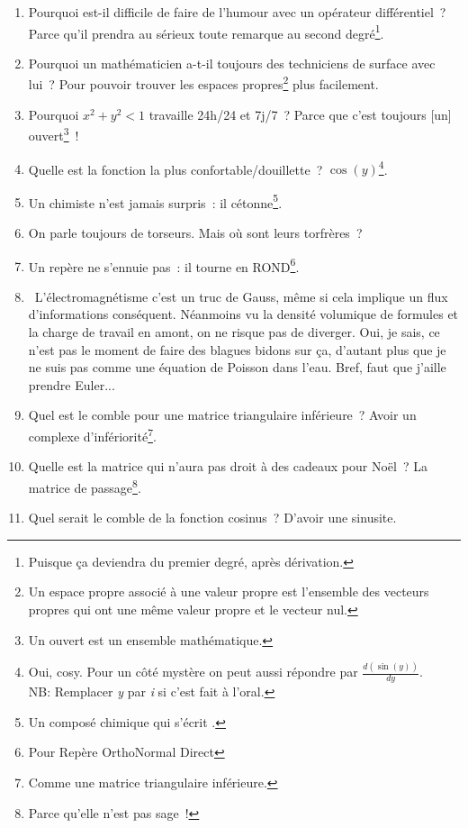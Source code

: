 \documentclass[10pt,a5paper,fullpage]{book}
\begin{document}
\begin{enumerate}
		\item Pourquoi est-il difficile de faire de l’humour avec un opérateur différentiel~? Parce qu’il prendra au sérieux toute remarque au second degré\footnote{Puisque ça deviendra du premier degré, après dérivation.}.
		\item Pourquoi un mathématicien a-t-il toujours des techniciens de surface avec lui~? Pour pouvoir trouver les espaces propres\footnote{Un espace propre associé à une valeur propre est l'ensemble des vecteurs propres qui ont une même valeur propre et le vecteur nul.} plus facilement.
		\item Pourquoi $x^{2}+y^{2} < 1$ travaille 24h/24 et 7j/7~? Parce que c’est toujours [un] ouvert\footnote{Un ouvert est un ensemble mathématique.}~!
		\item Quelle est la fonction la plus confortable/douillette~? $\cos(y)$\footnote{Oui, cosy. Pour un côté mystère on peut aussi répondre par $\frac{d(\sin({y}))}{dy}$. \\NB: Remplacer \textit{y} par \textit{i} si c’est fait à l’oral.}. 
		\item Un chimiste n’est jamais surpris~: il cétonne\footnote{Un composé chimique qui s’écrit .}.
		\item On parle toujours de torseurs. Mais où sont leurs torfrères~?
		\item Un repère ne s’ennuie pas~: il tourne en ROND\footnote{Pour Repère OrthoNormal Direct}.
		\item \guillemotleft~L'électromagnétisme c'est un truc de Gauss, même si cela implique un flux d'informations conséquent. Néanmoins vu la densité volumique de formules et la charge de travail en amont, on ne risque pas de diverger. Oui, je sais, ce n’est pas le moment de faire des blagues bidons sur ça, d'autant plus que je ne suis pas comme une équation de Poisson dans l'eau. Bref, faut que j'aille prendre Euler...~\guillemotright
		\item Quel est le comble pour une matrice triangulaire inférieure~? Avoir un complexe d’infériorité\footnote{Comme une matrice triangulaire inférieure.}.
		\item Quelle est la matrice qui n’aura pas droit à des cadeaux pour Noël~? La matrice de passage\footnote{Parce qu’elle n’est pas sage~!}.
		\item Quel serait le comble de la fonction cosinus~? D’avoir une sinusite.

\end{enumerate}
\end{document}
